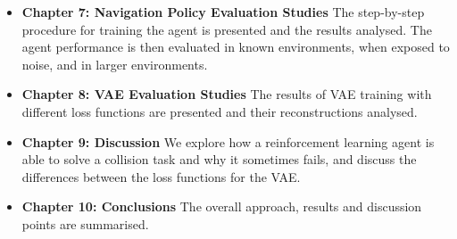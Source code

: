 \begin{itemize}
    \item \textbf{Chapter 7: Navigation Policy Evaluation Studies} 
    The step-by-step procedure for training the agent is presented and the results analysed. The agent performance is then evaluated in known environments, when exposed to noise, and in larger environments.
    \vspace{3mm}
    
    \item \textbf{Chapter 8: VAE Evaluation Studies} 
    The results of VAE training with different loss functions are presented and their reconstructions analysed.
    \vspace{3mm}
    
    \item \textbf{Chapter 9: Discussion}
    We explore how a reinforcement learning agent is able to solve a collision task and why it sometimes fails, and discuss the differences between the loss functions for the VAE.
    \vspace{3mm}
    
    \item \textbf{Chapter 10: Conclusions} \vspace{3mm}
    The overall approach, results and discussion points are summarised.
    
\end{itemize}





